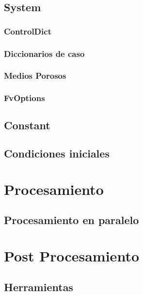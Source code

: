 	\subsection{System}
	\subsubsection{ControlDict}
	\subsubsection{Diccionarios de caso}
	\subsubsection{Medios Porosos}
	\subsubsection{FvOptions}
	\subsection{Constant}
	\subsection{Condiciones iniciales}
\section{Procesamiento}
	\subsection{Procesamiento en paralelo}
\section{Post Procesamiento}
	\subsection{Herramientas}
